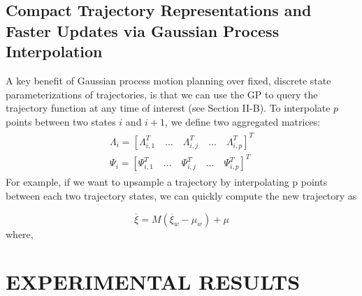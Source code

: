 \documentclass{IEEEtran}
\begin{document}
\subsection{Compact Trajectory Representations and Faster Updates
via Gaussian Process Interpolation}
A key benefit of Gaussian process motion planning over
fixed, discrete state parameterizations of trajectories, is that
we can use the GP to query the trajectory function at any
time of interest (see Section II-B). To interpolate $p$ points
between two states $i$ and $i + 1$, we define two aggregated
matrices:
\begin{equation*}
\begin{matrix}
\begin{split}
\Lambda_i=[\Lambda_{i,1}^T \quad \dots \quad \Lambda_{i,j}^T \quad \dots \quad\Lambda_{i,p}^T]^T\\
\Psi_i=[\Psi_{i,1}^T \quad \dots \quad \Psi_{i,j}^T \quad \dots \quad \Psi_{i,p}^T]^T
\end{split}
\tag{34}
\end{matrix}
\end{equation*}
For example, if we want to upsample a trajectory by interpolating p points between each two trajectory states, we can
quickly compute the new trajectory as

\begin{equation*}
\overline{\xi}=M(\overline{\xi}_w-{\mu}_w)+\mu\tag{35}
\end{equation*}
where,
\section{EXPERIMENTAL RESULTS}
\end{document}
